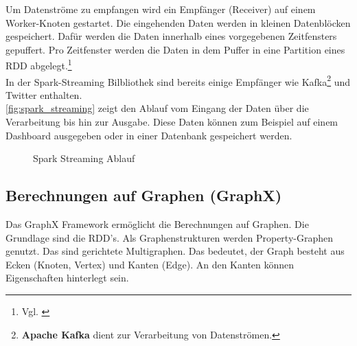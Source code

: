 \noindent
Um Datenströme zu empfangen wird ein Empfänger (Receiver) auf einem Worker-Knoten gestartet. Die eingehenden Daten werden in kleinen Datenblöcken gespeichert. Dafür werden die Daten innerhalb eines vorgegebenen Zeitfensters gepuffert. Pro Zeitfenster werden die Daten in dem Puffer in eine Partition eines RDD abgelegt.\footnote{Vgl. \cite{BDS16}} \\

\noindent
In der Spark-Streaming Bilbliothek sind bereits einige Empfänger wie Kafka\footnote{\textbf{Apache Kafka} dient zur Verarbeitung von Datenströmen.} und Twitter enthalten. \\
\autoref{fig:spark_streaming} zeigt den Ablauf vom Eingang der Daten über die Verarbeitung bis hin zur Ausgabe. Diese Daten können zum Beispiel auf einem Dashboard ausgegeben oder in einer Datenbank gespeichert werden.

\begin{figure}[h]
  \centering
  \caption{Spark Streaming Ablauf \cite{INFOQ_STREAMING}}\label{fig:spark_streaming}
\end{figure}





\newpage
\subsection{Berechnungen auf Graphen (GraphX)}

Das GraphX Framework ermöglicht die Berechnungen auf Graphen. Die Grundlage sind die RDD's. Als Graphenstrukturen werden Property-Graphen genutzt.
Das sind gerichtete Multigraphen. Das bedeutet, der Graph besteht aus Ecken (Knoten, Vertex) und Kanten (Edge). An den Kanten können Eigenschaften hinterlegt sein.\\

